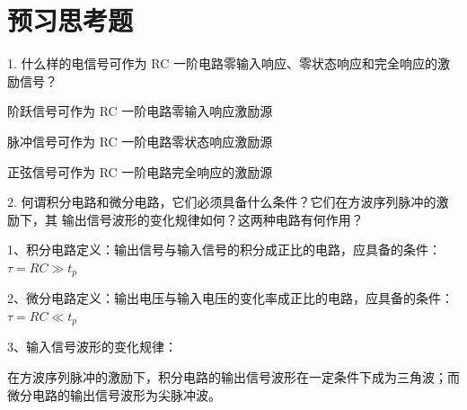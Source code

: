 \documentclass{article}
\begin{document}
\section{预习思考题}

1. 什么样的电信号可作为 RC 一阶电路零输入响应、零状态响应和完全响应的激励信号？ 

阶跃信号可作为 RC 一阶电路零输入响应激励源

脉冲信号可作为 RC 一阶电路零状态响应激励源

正弦信号可作为 RC 一阶电路完全响应的激励源

2. 何谓积分电路和微分电路，它们必须具备什么条件？它们在方波序列脉冲的激励下，其
输出信号波形的变化规律如何？这两种电路有何作用？

1、积分电路定义：输出信号与输入信号的积分成正比的电路，应具备的条件：  $\tau=R C \gg t_p$

2、微分电路定义：输出电压与输入电压的变化率成正比的电路，应具备的条件： $\tau=R C \ll t_p$

3、输入信号波形的变化规律：

在方波序列脉冲的激励下，积分电路的输出信号波形在一定条件下成为三角波；而微分电路的输出信号波形为尖脉冲波。
\end{document}
